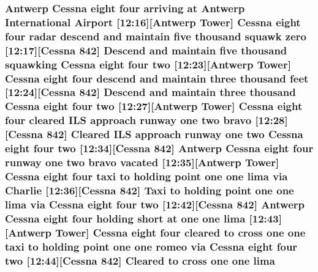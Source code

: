\subsubsection[{\texorpdfstring{lima}{lima}}]{\setlength{\rightskip}{0pt plus 5cm}Antwerp {\bf Cessna} eight four arriving at Antwerp International {\bf Airport} \mbox{[}12\+:16\mbox{]}\mbox{[}Antwerp {\bf Tower}\mbox{]} {\bf Cessna} eight four radar descend and maintain five {\bf thousand} squawk {\bf zero} \mbox{[}12\+:17\mbox{]}\mbox{[}{\bf Cessna} 842\mbox{]} Descend and maintain five {\bf thousand} {\bf squawking} {\bf Cessna} eight four {\bf two} \mbox{[}12\+:23\mbox{]}\mbox{[}Antwerp {\bf Tower}\mbox{]} {\bf Cessna} eight four descend and maintain three {\bf thousand} {\bf feet} \mbox{[}12\+:24\mbox{]}\mbox{[}{\bf Cessna} 842\mbox{]} Descend and maintain three {\bf thousand} {\bf Cessna} eight four {\bf two} \mbox{[}12\+:27\mbox{]}\mbox{[}Antwerp {\bf Tower}\mbox{]} {\bf Cessna} eight four cleared I\+LS approach runway {\bf one} {\bf two} {\bf bravo} \mbox{[}12\+:28\mbox{]}\mbox{[}{\bf Cessna} 842\mbox{]} Cleared I\+LS approach runway {\bf one} {\bf two} {\bf Cessna} eight four {\bf two} \mbox{[}12\+:34\mbox{]}\mbox{[}{\bf Cessna} 842\mbox{]} Antwerp {\bf Cessna} eight four runway {\bf one} {\bf two} {\bf bravo} vacated \mbox{[}12\+:35\mbox{]}\mbox{[}Antwerp {\bf Tower}\mbox{]} {\bf Cessna} eight four taxi to holding point {\bf one} {\bf one} lima via {\bf Charlie} \mbox{[}12\+:36\mbox{]}\mbox{[}{\bf Cessna} 842\mbox{]} Taxi to holding point {\bf one} {\bf one} lima via {\bf Cessna} eight four {\bf two} \mbox{[}12\+:42\mbox{]}\mbox{[}{\bf Cessna} 842\mbox{]} Antwerp {\bf Cessna} eight four holding short at {\bf one} {\bf one} lima \mbox{[}12\+:43\mbox{]}\mbox{[}Antwerp {\bf Tower}\mbox{]} {\bf Cessna} eight four cleared to cross {\bf one} {\bf one} taxi to holding point {\bf one} {\bf one} {\bf romeo} via {\bf Cessna} eight four {\bf two} \mbox{[}12\+:44\mbox{]}\mbox{[}{\bf Cessna} 842\mbox{]} Cleared to cross {\bf one} {\bf one} lima}\hypertarget{happyDay3ATC_8txt_ac72eb0c235def0bed8a43cd177e7bdc8}{}\label{happyDay3ATC_8txt_ac72eb0c235def0bed8a43cd177e7bdc8}
